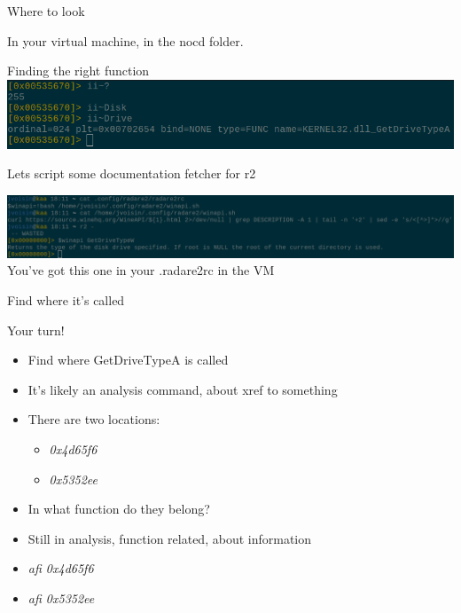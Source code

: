 \documentclass{beamer}
\begin{document}

\begin{frame}{Where to look}
	\begin{center}
		In your virtual machine, in the \alert{nocd} folder.
	\end{center}
\end{frame}

\begin{frame}{Finding the right function}
	\includegraphics[width=\textwidth]{ii.png}\\
\end{frame}

\begin{frame}{Lets script some documentation fetcher for r2}
	\begin{center}
		\includegraphics[width=\textwidth,height=.3\textheight]{script.png}\\
		\pause
		You've got this one in your .radare2rc in the VM
	\end{center}
\end{frame}

\begin{frame}{Find where it's called}
	\begin{block}{Your turn!}
		\begin{itemize}[<+->]
			\item Find where \alert{GetDriveTypeA} is called
			\item It's likely an \alert{a}nalysis command, about \alert{x}ref \alert{t}o something
			\item There are two locations:
				\begin{itemize}
					\item \emph{0x4d65f6}
					\item \emph{0x5352ee}
				\end{itemize}
			\item In what function do they belong?
			\item Still in \alert{a}nalysis, \alert{f}unction related, about \alert{i}nformation
			\item \emph{afi 0x4d65f6}
			\item \emph{afi 0x5352ee}
		\end{itemize}
	\end{block}
\end{frame}
\end{document}
